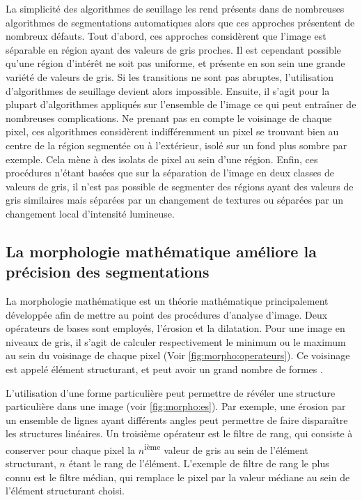 \documentclass[\main/main.tex]{subfiles}
\begin{document}
%
La simplicité des algorithmes de seuillage les rend présents dans de nombreuses algorithmes de segmentations automatiques alors que  ces approches présentent de nombreux défauts.
%
Tout d'abord, ces approches considèrent que l'image est séparable en région ayant des valeurs de gris proches. Il est cependant possible qu'une région d'intérêt ne soit pas uniforme, et présente en son sein une grande variété de valeurs de gris. Si les transitions ne sont pas abruptes, l'utilisation d'algorithmes de seuillage devient alors impossible.
Ensuite, il s'agit pour la plupart d'algorithmes appliqués sur l'ensemble de l'image ce qui peut entraîner de nombreuses complications.
%
Ne prenant pas en compte le voisinage de chaque pixel, ces algorithmes considèrent indifféremment un pixel se trouvant bien au centre de la région segmentée ou à l'extérieur, isolé sur un fond plus sombre par exemple. Cela mène à des isolats de pixel au sein d'une région.
%
Enfin, ces procédures n'étant basées que sur la séparation de l'image en deux classes de valeurs de gris, il n'est pas possible de segmenter des régions ayant des valeurs de gris similaires mais séparées par un changement de textures ou séparées par un changement local d'intensité lumineuse.

    \subsection{La morphologie mathématique améliore la précision des segmentations\label{sec:intro:morpho}}
    
%
La morphologie mathématique est un théorie mathématique principalement développée afin de mettre au point des procédures d'analyse d'image.
%
Deux opérateurs de bases sont employés, l'érosion et la dilatation.
%
Pour une image en niveaux de gris, il s'agit de calculer respectivement le minimum ou le maximum au sein du voisinage de chaque pixel (Voir \autoref{fig:morpho:operateurs}).
%
Ce voisinage est appelé élément structurant, et peut avoir un grand nombre de formes .


%
L'utilisation d'une forme particulière peut permettre de révéler une structure particulière dans une image (voir \autoref{fig:morpho:es}).
%
Par exemple, une érosion par un ensemble de lignes ayant différents angles peut permettre de faire disparaître les structures linéaires.
%
Un troisième opérateur est le filtre de rang, qui consiste à conserver pour chaque pixel la $n$\textsuperscript{ième} valeur de gris au sein de l'élément structurant, $n$ étant le rang de l'élément.
%
L'exemple de filtre de rang le plus connu est le filtre médian, qui remplace le pixel par la valeur médiane au sein de l'élément structurant choisi.
\end{document}
